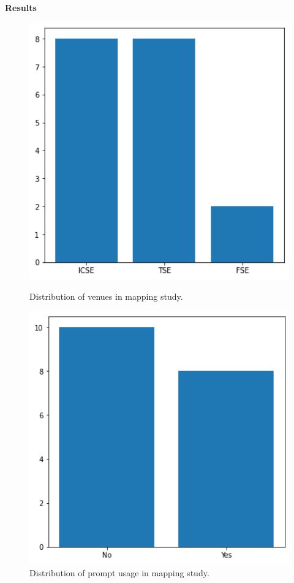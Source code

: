 \documentclass[a4paper]{article}
\begin{document}
\textbf{Results}\\
\begin{figure}[h]
	\hfill
	\begin{minipage}{0.45\textwidth}
		\includegraphics[width=1\textwidth]{figures/Venues.png}
		\caption{Distribution of venues in mapping study.}
		\label{fig:Venues}
	\end{minipage}
	\hfill
	\begin{minipage}{0.45\textwidth}
		\includegraphics[width=1\textwidth]{figures/Prompts.png}
		\caption{Distribution of prompt usage in mapping study.}
		\label{fig:Prompts}
	\end{minipage}
	\hfill
\end{figure}
\end{document}
